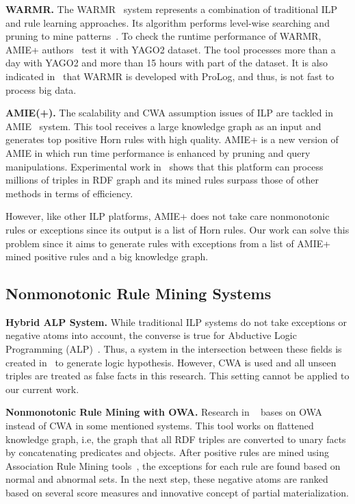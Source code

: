 \textbf{WARMR.} The WARMR~\cite{ref16, ref17} system represents a combination of traditional ILP and rule learning approaches. Its algorithm performs level-wise searching and pruning to mine patterns~\cite{ref10}. To check the runtime performance of WARMR, AMIE+ authors~\cite{ref10} test it with YAGO2 dataset. The tool processes more than a day with YAGO2 and more than 15 hours with part of the dataset. It is also indicated in~\cite{ref10} that WARMR is developed with ProLog, and thus, is not fast to process big data.

\textbf{AMIE(+).} The scalability and CWA assumption issues of ILP are tackled in AMIE~\cite{ref10} system. This tool receives a large knowledge graph as an input and generates top positive Horn rules with high quality. AMIE+ is a new version of AMIE in which run time performance is enhanced by pruning and query manipulations. Experimental work in~\cite{ref10} shows that this platform can process millions of triples in RDF graph and its mined rules surpass those of other methods in terms of efficiency.

However, like other ILP platforms, AMIE+ does not take care nonmonotonic rules or exceptions since its output is a list of Horn rules. Our work can solve this problem since it aims to generate rules with exceptions from a list of AMIE+ mined positive rules and a big knowledge graph.

\subsection{Nonmonotonic Rule Mining Systems}
\label{related-work-nonmonotonic-rule-mining-systems}

\textbf{Hybrid ALP System.} While traditional ILP systems do not take exceptions or negative atoms into account, the converse is true for Abductive Logic Programming (ALP)~\cite{ref11}. Thus, a system in the intersection between these fields is created in~\cite{ref11} to generate logic hypothesis. However, CWA is used and all unseen triples are treated as false facts in this research. This setting cannot be applied to our current work.

\textbf{Nonmonotonic Rule Mining with OWA.} Research in ~\cite{ref12} bases on OWA instead of CWA in some mentioned systems. This tool works on flattened knowledge graph, i.e, the graph that all RDF triples are converted to unary facts by concatenating predicates and objects. After positive rules are mined using Association Rule Mining tools~\cite{ref13}, the exceptions for each rule are found based on normal and abnormal sets. In the next step, these negative atoms are ranked based on several score measures and innovative concept of partial materialization.

